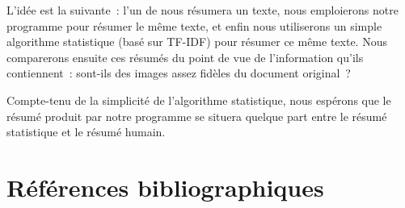 \documentclass[a4paper, 12pt]{article}
\begin{document}
L'idée est la suivante~: l'un de nous résumera un texte, nous emploierons notre programme pour résumer le même texte, et enfin nous utiliserons un simple algorithme statistique (basé sur TF-IDF) pour résumer ce même texte. Nous comparerons ensuite ces résumés du point de vue de l'information qu'ils contiennent~: sont-ils des images assez fidèles du document original~?

Compte-tenu de la simplicité de l'algorithme statistique, nous espérons que le résumé produit par notre programme se situera quelque part entre le résumé statistique et le résumé humain.

\section{Références bibliographiques}

\nocite{*}
\printbibliography{}

\appendix

\printindex
\end{document}
